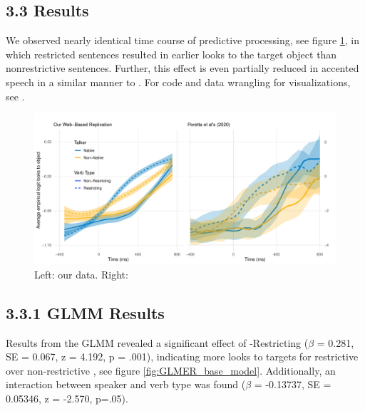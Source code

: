 







\subsection{3.3 Results}

 We observed nearly identical time course of predictive processing, see figure \ref{fig:smooth}, in which restricted sentences resulted in earlier looks to the target object than nonrestrictive sentences. Further, this effect is even partially reduced in accented speech in a similar manner to \textcite{Porretta_et_al_2020}. For  code and data wrangling for visualizations, see .

\begin{figure}[h]
    \centering
    \includegraphics[width=\textwidth]{figures/smooth_comparison_plot.pdf}
    \caption{Left: our data. Right: \textcite{Porretta_et_al_2020}}
    \label{fig:smooth}
\end{figure}

\subsection{3.3.1 GLMM Results}
Results from the GLMM revealed a significant effect of  -Restricting  ($\beta$ = 0.281, SE = 0.067, z = 4.192, p = .001), indicating more looks to targets for restrictive  over non-restrictive , see figure \ref{fig:GLMER_base_model}. Additionally, an interaction between speaker and verb type was found ($\beta$ = -0.13737, SE = 0.05346, z = -2.570, p=.05).


